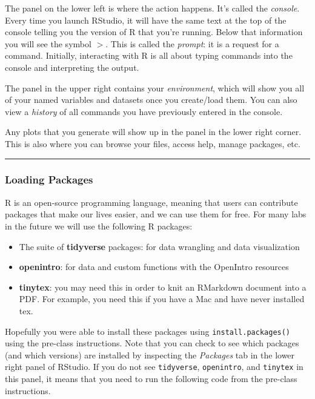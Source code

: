 \documentclass[
]{article}
\makeatletter
\newcommand*\pandocbounded[1]{%
  \sbox\pandoc@box{#1}%
  \Gscale@div\@tempa{\textheight}{\dimexpr\ht\pandoc@box+\dp\pandoc@box\relax}%
  \Gscale@div\@tempb{\linewidth}{\wd\pandoc@box}%
  \ifdim\@tempb\p@<\@tempa\p@\let\@tempa\@tempb\fi%
  \ifdim\@tempa\p@<\p@\scalebox{\@tempa}{\usebox\pandoc@box}%
  \else\usebox{\pandoc@box}%
  \fi%
}
\providecommand{\tightlist}{%
  \setlength{\itemsep}{0pt}\setlength{\parskip}{0pt}}
\makeatother
\begin{document}
\pandocbounded{\texttt{[image: R\_interface.png]}}

The panel on the lower left is where the action happens. It's called the
\emph{console}. Every time you launch RStudio, it will have the same
text at the top of the console telling you the version of R that you're
running. Below that information you will see the symbol \(>\). This is
called the \emph{prompt}: it is a request for a command. Initially,
interacting with R is all about typing commands into the console and
interpreting the output.

The panel in the upper right contains your \emph{environment}, which
will show you all of your named variables and datasets once you
create/load them. You can also view a \emph{history} of all commands you
have previously entered in the console.

Any plots that you generate will show up in the panel in the lower right
corner. This is also where you can browse your files, access help,
manage packages, etc.

\begin{center}\rule{0.5\linewidth}{0.5pt}\end{center}

\subsubsection{Loading Packages}\label{loading-packages}

R is an open-source programming language, meaning that users can
contribute packages that make our lives easier, and we can use them for
free. For many labs in the future we will use the following R packages:

\begin{itemize}
\tightlist
\item
  The suite of \textbf{tidyverse} packages: for data wrangling and data
  visualization
\item
  \textbf{openintro}: for data and custom functions with the OpenIntro
  resources
\item
  \textbf{tinytex}: you may need this in order to knit an RMarkdown
  document into a PDF. For example, you need this if you have a Mac and
  have never installed tex.
\end{itemize}

Hopefully you were able to install these packages using
\texttt{install.packages()} using the pre-class instructions. Note that
you can check to see which packages (and which versions) are installed
by inspecting the \emph{Packages} tab in the lower right panel of
RStudio. If you do not see \texttt{tidyverse}, \texttt{openintro}, and
\texttt{tinytex} in this panel, it means that you need to run the
following code from the pre-class instructions.
\end{document}
